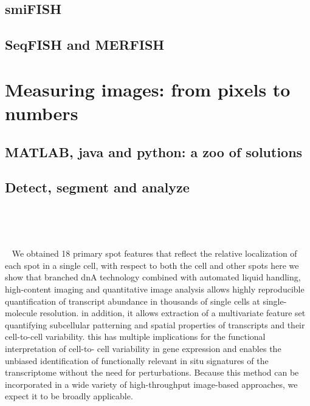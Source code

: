 \subsection{\ac{smiFISH}}

\subsection{\ac{SeqFISH} and \ac{MERFISH}}

\section{Measuring images: from pixels to numbers}
\label{sec:computation_biology}

\subsection{MATLAB, java and python: a zoo of solutions}

\subsection{Detect, segment and analyze}

~\cite{shariff_automated_2010}
~\cite{laux_interactive_2020}
~\cite{das_intracellular_2021}

~\cite{mcquin_cellprofiler_2018}
~\cite{mueller_fish-quant_2013}
~\cite{de_chaumont_icy_2012}
~\cite{ershov_bringing_2021} %
~\cite{ljosa_introduction_2009}
~\cite{stoeger_computer_2015}
~\cite{perkel_starfish_2019}
~\cite{noauthor_mammalian_2020}
~\cite{eng_transcriptome-scale_2019}
~\cite{kamenova_co-translational_2019}
~\cite{liao_rna_2019}
~\cite{xia_spatial_2019}
~\cite{tsanov_smifish_2016}
~\cite{samacoits_computational_2018}
~\cite{battich_image-based_2013}
~\cite{savulescu_interrogating_2021}

~\cite{battich_image-based_2013}
We obtained 18 primary spot features that reflect the
relative localization of each spot in a single cell, with respect to both the cell and other spots
here we show that branched dnA technology combined with automated liquid handling, high-content imaging and quantitative image analysis allows highly reproducible quantification of transcript abundance in thousands of single cells at single-molecule resolution.
in addition, it allows extraction of a multivariate feature set quantifying subcellular patterning and spatial properties of transcripts and their cell-to-cell variability. this has multiple implications for the functional interpretation of cell-to-
cell variability in gene expression and enables the unbiased identification of functionally relevant in situ signatures
of the transcriptome without the need for perturbations. Because this method can be incorporated in a wide variety of high-throughput image-based approaches, we expect it to be broadly applicable.

